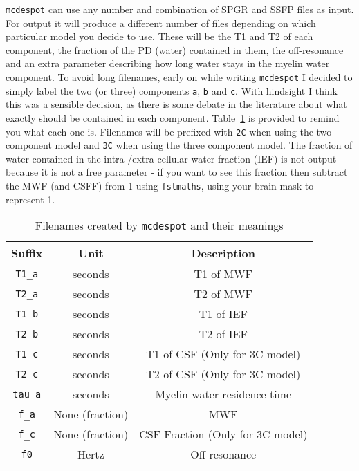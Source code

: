 \documentclass{report}
\begin{document}
\texttt{mcdespot} can use any number and combination of SPGR and SSFP files as input. For output it will produce a different number of files depending on which particular model you decide to use. These will be the T1 and T2 of each component, the fraction of the PD (water) contained in them, the off-resonance and an extra parameter describing how long water stays in the myelin water component. To avoid long filenames, early on while writing \texttt{mcdespot} I decided to simply label the two (or three) components \texttt{a}, \texttt{b} and \texttt{c}. With hindsight I think this was a sensible decision, as there is some debate in the literature about what exactly should be contained in each component. Table~\ref{mcdespotfilenames} is provided to remind you what each one is. Filenames will be prefixed with \texttt{2C} when using the two component model and \texttt{3C} when using the three component model. The fraction of water contained in the intra-/extra-cellular water fraction (IEF) is not output because it is not a free parameter - if you want to see this fraction then subtract the MWF (and CSFF) from 1 using \texttt{fslmaths}, using your brain mask to represent 1.

\begin{table}\begin{center}
\begin{tabular}{c c c}
\hline
Suffix	& Unit	& Description\\
\hline
\texttt{T1\_a}	& seconds & T1 of MWF \\
\texttt{T2\_a}	& seconds & T2 of MWF \\
\texttt{T1\_b}	& seconds & T1 of IEF \\
\texttt{T2\_b}	& seconds & T2 of IEF \\
\texttt{T1\_c}	& seconds & T1 of CSF (Only for 3C model) \\
\texttt{T2\_c}	& seconds & T2 of CSF (Only for 3C model) \\
\texttt{tau\_a}	& seconds & Myelin water residence time \\
\texttt{f\_a}	& None (fraction) & MWF \\
\texttt{f\_c}	& None (fraction) & CSF Fraction (Only for 3C model) \\
\texttt{f0}		& Hertz  & Off-resonance \\
\hline
\end{tabular}
\caption{Filenames created by \texttt{mcdespot} and their meanings}
\label{mcdespotfilenames}
\end{center}\end{table}	
\end{document}
